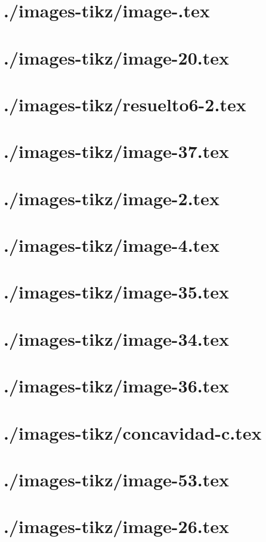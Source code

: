 \documentclass[]{article}
\begin{document}
\markboth{\jobname}{\jobname}
\section{./images-tikz/image-.tex} 
\section{./images-tikz/image-20.tex} 
\section{./images-tikz/resuelto6-2.tex} 
\section{./images-tikz/image-37.tex} 
\section{./images-tikz/image-2.tex} 
\section{./images-tikz/image-4.tex} 
\section{./images-tikz/image-35.tex} 
\section{./images-tikz/image-34.tex} 
\section{./images-tikz/image-36.tex} 
\section{./images-tikz/concavidad-c.tex} 
\section{./images-tikz/image-53.tex} 
\section{./images-tikz/image-26.tex} 
\end{document}
